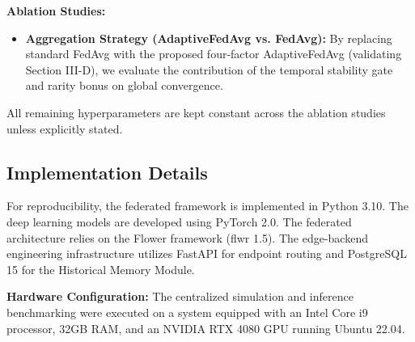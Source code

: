 \textbf{Ablation Studies:}
\begin{itemize}
    \item \textbf{Aggregation Strategy (AdaptiveFedAvg vs. FedAvg):} By replacing standard FedAvg with the proposed four-factor AdaptiveFedAvg (validating Section III-D), we evaluate the contribution of the temporal stability gate and rarity bonus on global convergence.
\end{itemize}

All remaining hyperparameters are kept constant across the ablation studies unless explicitly stated.

\subsection{Implementation Details}

For reproducibility, the federated framework is implemented in Python 3.10. The deep learning models are developed using PyTorch 2.0. The federated architecture relies on the Flower framework (flwr 1.5). The edge-backend engineering infrastructure utilizes FastAPI for endpoint routing and PostgreSQL 15 for the Historical Memory Module.

\textbf{Hardware Configuration:}
The centralized simulation and inference benchmarking were executed on a system equipped with an Intel Core i9 processor, 32GB RAM, and an NVIDIA RTX 4080 GPU running Ubuntu 22.04.

